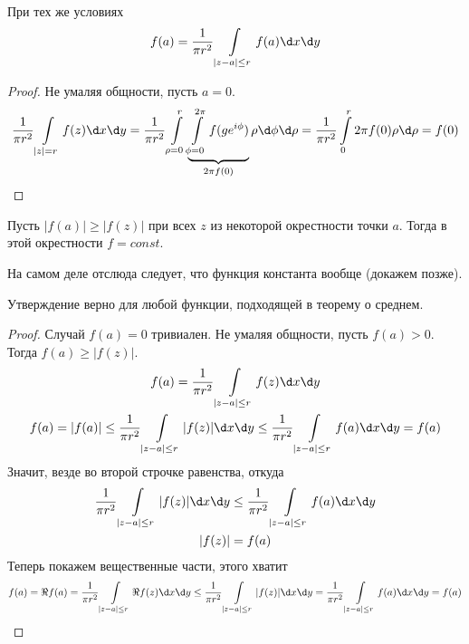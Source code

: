 \begin{conseq}
	При тех же условиях
	\[ f(a) = \frac1{\pi r^2}\int\limits_{|z - a| \le r} f(a) \d x \d y \]
\end{conseq}
\begin{proof}
	Не умаляя общности, пусть $a = 0$.
	\begin{gather*}
		\frac1{\pi r^2} \int\limits_{|z| = r} f(z) \d x \d y
		= \frac1{\pi r^2} \int\limits_{\rho=0}^r \underbrace{\int\limits_{\phi=0}^{2\pi} f(ge^{i\phi})}_{2\pi f(0)} \rho \d \phi \d \rho
		= \frac1{\pi r^2} \int\limits_0^r 2\pi f(0) \rho \d \rho
		= f(0)
	\end{gather*}
\end{proof}

\begin{theorem}
	Пусть $|f(a)| \ge |f(z)|$ при всех $z$ из некоторой окрестности точки $a$.
	Тогда в этой окрестности $f = const$.
\end{theorem}
\begin{Rem}
	На самом деле отслюда следует, что функция константа вообще (докажем позже).
\end{Rem}
\begin{Rem}
	Утверждение верно для любой функции, подходящей в теорему о среднем.
\end{Rem}
\begin{proof}
	Случай $f(a) = 0$ тривиален. Не умаляя общности, пусть $f(a) > 0$.
	Тогда $f(a) \ge |f(z)|$.
	\begin{gather*}
		f(a) = \frac1{\pi r^2} \int\limits_{|z - a| \le r} f(z) \d x \d y \\
		f(a) = |f(a)| \le \frac1{\pi r^2} \int\limits_{|z - a| \le r} |f(z)| \d x \d y
		\le \frac1{\pi r^2} \int\limits_{|z - a| \le r} f(a) \d x \d y
		= f(a)
	\end{gather*}
	Значит, везде во второй строчке равенства, откуда
	\begin{gather*}
		\frac1{\pi r^2} \int\limits_{|z - a| \le r} |f(z)| \d x \d y \le \frac1{\pi r^2} \int\limits_{|z - a| \le r} f(a) \d x \d y \\
		|f(z)| = f(a)
	\end{gather*}
	Теперь покажем вещественные части, этого хватит
	\begin{gather*}
		f(a) = \Re f(a)
		= \frac1{\pi r^2} \int\limits_{|z - a| \le r} \Re f(z) \d x \d y
		\le \frac1{\pi r^2} \int\limits_{|z - a| \le r} |f(z)| \d x \d y
		= \frac1{\pi r^2} \int\limits_{|z - a| \le r} f(a) \d x \d y = f(a)
	\end{gather*}
\end{proof}

